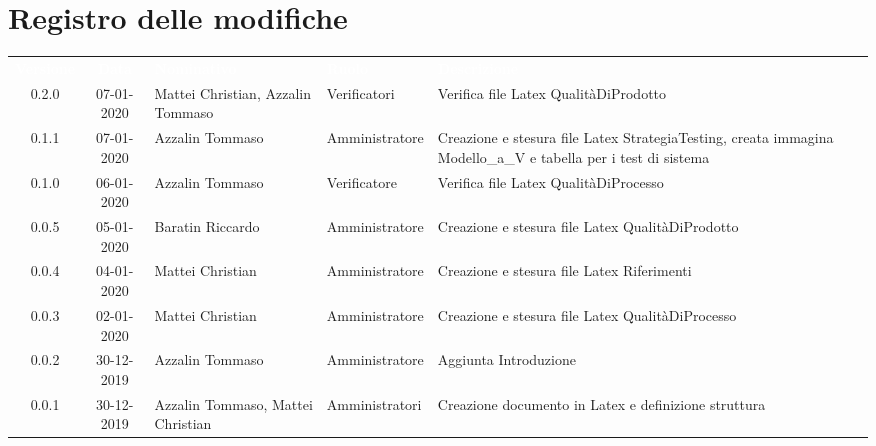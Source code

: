 \section*{Registro delle modifiche}
{
\renewcommand{\arraystretch}{1.5}
\centering
\begin{longtable}{ c c  C{4cm}  C{3cm} C{4cm}}
\textcolor{white}{\textbf{Versione}} & \textcolor{white}{\textbf{Data}} & \textcolor{white}{\textbf{Nominativo}} & \textcolor{white}{\textbf{Ruolo}} & \textcolor{white}{\textbf{Descrizione}}\\	

0.2.0 & 07-01-2020 & Mattei Christian, Azzalin Tommaso & Verificatori & Verifica file Latex QualitàDiProdotto \\
0.1.1 & 07-01-2020 & Azzalin Tommaso & Amministratore & Creazione e stesura file Latex StrategiaTesting, creata immagina Modello_a_V e tabella per i test di sistema \\
0.1.0 & 06-01-2020 & Azzalin Tommaso & Verificatore & Verifica file Latex QualitàDiProcesso \\
0.0.5 & 05-01-2020 & Baratin Riccardo & Amministratore & Creazione e stesura file Latex QualitàDiProdotto \\
0.0.4 & 04-01-2020 & Mattei Christian & Amministratore & Creazione e stesura file Latex Riferimenti \\
0.0.3 & 02-01-2020 & Mattei Christian & Amministratore & Creazione e stesura file Latex QualitàDiProcesso \\
0.0.2 & 30-12-2019 & Azzalin Tommaso & Amministratore & Aggiunta Introduzione \\
0.0.1 & 30-12-2019 & Azzalin Tommaso, Mattei Christian & Amministratori & Creazione documento in Latex e definizione struttura \\	
		
\end{longtable}
}
